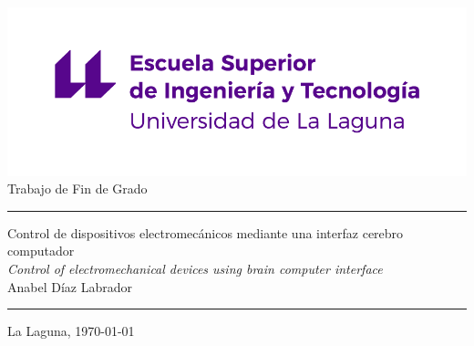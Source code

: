 \pagestyle{empty}
\thispagestyle{empty}


\newcommand{\HRule}{\rule{\linewidth}{1mm}}
\setlength{\parindent}{0mm}
\setlength{\parskip}{0mm}


\begin{center}
\includegraphics[scale=0.8]{figures/escuela-ingenieria-tecnologia-original}\\[10mm]
{\Huge Trabajo de Fin de Grado}
\end{center}

\HRule
\begin{flushright}
        {\Huge Control de dispositivos electromecánicos mediante una interfaz cerebro computador} \\[2.5mm]
        {\Large \textit{Control of electromechanical devices using brain computer interface}} \\[5mm]
        {\Large Anabel Díaz Labrador} \\[5mm]


\end{flushright}
\HRule
{}
\begin{center}
  \Large La Laguna, \today
\end{center}

\setlength{\parindent}{5mm}